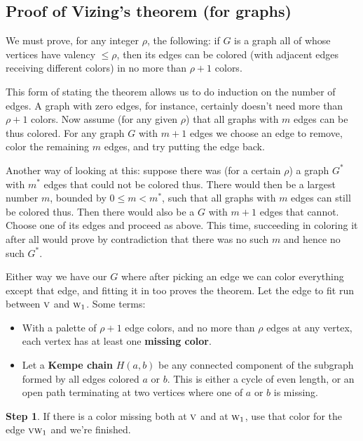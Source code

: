 \documentclass[12pt]{article}
\let\le\leqslant
\def\0#1{\hbox{\sc #1}}    %
\begin{document}


\subsection*{Proof of Vizing's theorem (for graphs)}

We must prove, for any integer $\rho$, the following: if $G$ is a graph all of
whose vertices have valency $\le \rho$, then its edges can be colored (with
adjacent edges receiving different colors) in no more than $\rho+1$ colors.

This form of stating the theorem allows us to do induction on the
number of edges. A graph with zero edges, for instance, certainly doesn't
need more than $\rho+1$ colors. Now assume (for any given $\rho$) that
all graphs with $m$ edges can be thus colored. For any graph $G$ with $m+1$
edges we choose an edge to remove, color the remaining $m$ edges, and
try putting the edge back.

Another way of looking at this: suppose there was (for a certain $\rho$) a
graph $G^*$ with $m^*$ edges that could not be colored thus. There would then
be a largest number $m$, bounded by $0\le m\lt m^*$, such that all graphs with
$m$ edges can still be colored thus. Then there would also be a $G$ with $m+1$
edges that cannot. Choose one of its edges and proceed as above. This time,
succeeding in coloring it after all would prove by contradiction that there
was no such $m$ and hence no such $G^*$.

Either way we have our $G$ where after picking an edge we can color everything
except that edge, and fitting it in too proves the theorem. Let the edge to
fit run between $\0v$ and $\0w_1$. Some terms:
%
\begin{itemize}

\item With a palette of $\rho+1$ edge colors, and no more than $\rho$ edges
      at any vertex, each vertex has at least one {\bf missing color}.

\item Let a {\bf Kempe chain} $H(a,b)$ be any connected component of the
      subgraph formed by all edges colored $a$ or $b$. This is either a
      cycle of even length, or an open path terminating at two vertices
      where one of $a$ or $b$ is missing.

\end{itemize}
%
{\bf Step 1}. If there is a color missing both at $\0v$ and at $\0w_1$, use
that color for the edge $\0v\0w_1$ and we're finished.
\end{document}
